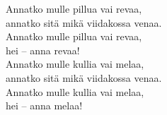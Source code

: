 
            Annatko mulle pillua vai revaa, \\
            annatko sitä mikä viidakossa venaa. \\
            Annatko mulle pillua vai revaa, \\
            hei – anna revaa! \\
            Annatko mulle kullia vai melaa, \\
            annatko sitä mikä viidakossa venaa. \\
            Annatko mulle kullia vai melaa, \\
            hei – anna melaa! \\
